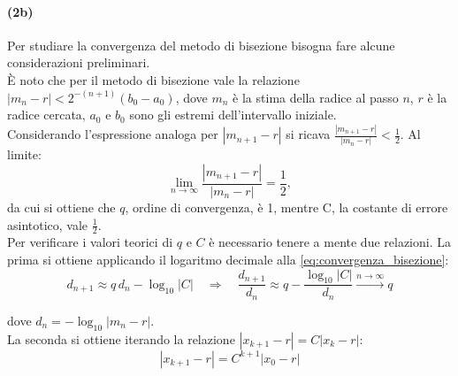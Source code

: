 \documentclass[letterpaper, 12pt]{article}
\numberwithin{equation}{section}    %
\begin{document}
\paragraph{(2b)}Per studiare la convergenza del metodo di bisezione bisogna fare alcune considerazioni 
preliminari. \\
È noto che per il metodo di bisezione vale la relazione $ |m_n-r|< 2^{-(n+1)} (b_0-a_0) $, dove $m_n$ è 
la stima della radice al passo $n$, $r$ è la radice cercata, $a_0$ e $b_0$ sono gli estremi dell'intervallo 
iniziale. \\
Considerando l'espressione analoga per $ |m_{n+1}-r|$ si ricava $\frac{|m_{n+1}-r|}{|m_n-r|} < \frac{1}{2}$. 
Al limite: 
\begin{equation}
    \label{eq:convergenza_bisezione}
    \lim_{n\to\infty} \frac{|m_{n+1}-r|}{|m_n-r|} = \frac{1}{2}, 
\end{equation}
da cui si ottiene che $q$, ordine di convergenza, 
è 1, mentre C, la costante di errore asintotico, vale $\frac{1}{2}$. \\
Per verificare i valori teorici di $q$ e $C$ è necessario tenere a mente due relazioni. La prima si ottiene
applicando il logaritmo decimale alla \ref{eq:convergenza_bisezione}:
\begin{equation}
    \label{eq:convergenza_bisezione_log}
    d_{n+1} \approx q\, d_n - \log_{10}|C|
    \quad\Rightarrow\quad
    \frac{d_{n+1}}{d_n} \approx q - \frac{\log_{10}|C|}{d_n}
    \overset{n\to\infty}{\longrightarrow} q
\end{equation}

dove $d_n = -\log_{10}|m_n - r|$. \\
La seconda si ottiene iterando la relazione  $ |x_{k+1} - r|= C |x_{k} - r|$:
\begin{equation}
    \label{eq:stima_C}
    |x_{k+1} - r|= C^{k+1} |x_{0} - r|
\end{equation}
\end{document}
